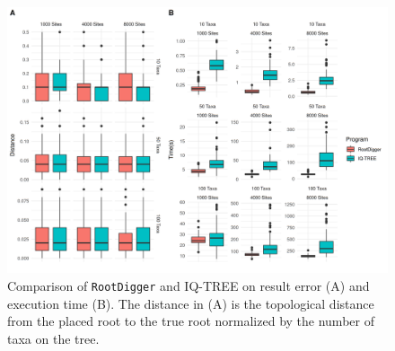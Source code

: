 \documentclass{article}
\newcommand{\RootDiggertt}{\texttt{RootDigger}}
\begin{document}

\begin{figure}
  \begin{center}
    \includegraphics[width=\linewidth]{./figs/time_distance_boxplot.png}
    \caption{Comparison of \RootDiggertt{} and IQ-TREE on result error (A) and
      execution time (B). The distance in (A) is the topological distance from
      the placed root to the true root normalized by the number of taxa on the
      tree.
    \label{fig:timing-box-plot}}
\end{center}
\end{figure}


\end{document}
